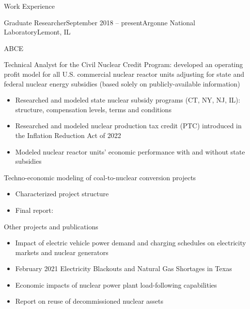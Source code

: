 \documentclass{resume} %
\begin{document}

\begin{rSection}{Work Experience}

\begin{rSubsection}{Graduate Researcher}{September 2018 -- present}{Argonne National Laboratory}{Lemont, IL}
  \setlength{\itemsep}{-5pt}
  \item ABCE

  \item Technical Analyst for the Civil Nuclear Credit Program: developed an operating profit model for all U.S. commercial nuclear reactor units adjusting for state and federal nuclear energy subsidies (based solely on publicly-available information)
  \begin{itemize}
    \item Researched and modeled state nuclear subsidy programs (CT, NY, NJ, IL): structure, compensation levels, terms and conditions
    \item Researched and modeled nuclear production tax credit (PTC) introduced in the Inflation Reduction Act of 2022
    \item Modeled nuclear reactor units' economic performance with and without state subsidies
  \end{itemize}

  \item Techno-economic modeling of coal-to-nuclear conversion projects
  \begin{itemize}
    \item Characterized project structure
    \item Final report:
  \end{itemize}

  \item Other projects and publications
  \begin{itemize}
    \item Impact of electric vehicle power demand and charging schedules on electricity markets and nuclear generators
    \item February 2021 Electricity Blackouts and Natural Gas Shortages in Texas
    \item Economic impacts of nuclear power plant load-following capabilities
    \item Report on reuse of decommissioned nuclear assets
  \end{itemize}


\end{rSubsection}
\end{rSection}
\end{document}
